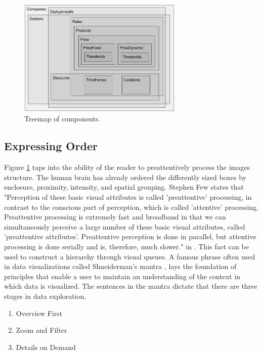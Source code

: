\begin{figure}[H]
	\centering
	\includegraphics[width=0.7\textwidth]{Treemap}
	\caption[Treemap of Components]{Treemap of components.}
	\label{fig:Treemap}
\end{figure}

\subsection{Expressing Order}
Figure \ref{fig:Treemap} taps into the ability of the reader to preattentively process the images structure. The human brain has already ordered the differently sized boxes by enclosure, proximity, intensity, and spatial grouping. Stephen Few states that "Perception of these basic visual attributes is called 'preattentive' processing, in contrast to the conscious part of perception, which is called 'attentive' processing. Preattentive processing is extremely fast and broadband in that we can simultaneously perceive a large number of these basic visual attributes, called 'preattentive attributes'. Preattentive perception is done in parallel, but attentive processing is done serially and is, therefore, much slower." in \cite[p.~3]{few}. This fact can be used to construct a hierarchy through visual queues. A famous phrase often used in data visualizations called Shneiderman's mantra \cite{mantra}, lays the foundation of principles that enable a user to maintain an understanding of the context in which data is visualized. The sentences in the mantra dictate that there are three stages in data exploration.

\begin{enumerate}
	\item Overview First
	\item Zoom and Filter
	\item Details on Demand
\end{enumerate}

